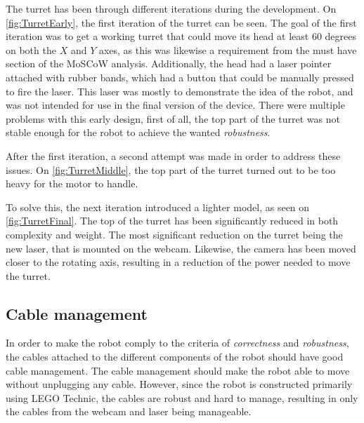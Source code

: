 The turret has been through different iterations during the development. 
On \autoref{fig:TurretEarly}, the first iteration of the turret can be seen.
The goal of the first iteration was to get a working turret that could move its head at least 60 degrees on both the $X$ and $Y$ axes, as this was likewise a requirement from the must have section of the MoSCoW analysis.
Additionally, the head had a laser pointer attached with rubber bands, which had a button that could be manually pressed to fire the laser.
This laser was mostly to demonstrate the idea of the robot, and was not intended for use in the final version of the device.
There were multiple problems with this early design, first of all, the top part of the turret was not stable enough for the robot to achieve the wanted \textit{robustness}.

After the first iteration, a second attempt was made in order to address these issues. 
On \autoref{fig:TurretMiddle}, the top part of the turret turned out to be too heavy for the motor to handle. 

To solve this, the next iteration introduced a lighter model, as seen on \autoref{fig:TurretFinal}.
The top of the turret has been significantly reduced in both complexity and weight. 
The most significant reduction on the turret being the new laser, that is mounted on the webcam.
Likewise, the camera has been moved closer to the rotating axis, resulting in a reduction of the power needed to move the turret. 

\subsection{Cable management}
In order to make the robot comply to the criteria of \textit{correctness} and \textit{robustness}, the cables attached to the different components of the robot should have good cable management. 
The cable management should make the robot able to move without unplugging any cable.
However, since the robot is constructed primarily using LEGO Technic, the cables are robust and hard to manage, resulting in only the cables from the webcam and laser being manageable. 
